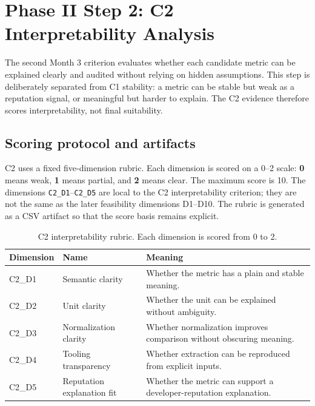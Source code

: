 \section{Phase II Step 2: C2 Interpretability Analysis}
\label{sec:phase2_c2_interpretability}

The second Month 3 criterion evaluates whether each candidate metric can be explained clearly and audited
without relying on hidden assumptions. This step is deliberately separated from C1 stability: a metric can be
stable but weak as a reputation signal, or meaningful but harder to explain. The C2 evidence therefore scores
interpretability, not final suitability.

\subsection{Scoring protocol and artifacts}
\label{sec:c2_protocol_artifacts}

C2 uses a fixed five-dimension rubric. Each dimension is scored on a 0--2 scale:
\textbf{0} means weak, \textbf{1} means partial, and \textbf{2} means clear. The maximum score is 10.
The dimensions \texttt{C2\_D1}--\texttt{C2\_D5} are local to the C2 interpretability criterion; they are not
the same as the later feasibility dimensions D1--D10. The rubric is generated as a CSV artifact so that the
score basis remains explicit.

\begin{table}[H]
\centering
\scriptsize
\renewcommand{\arraystretch}{1.08}
\begin{tabularx}{\textwidth}{p{2.1cm}p{3.6cm}X}
\toprule
\textbf{Dimension} & \textbf{Name} & \textbf{Meaning} \\
\midrule
C2\_D1 & Semantic clarity & Whether the metric has a plain and stable meaning. \\
C2\_D2 & Unit clarity & Whether the unit can be explained without ambiguity. \\
C2\_D3 & Normalization clarity & Whether normalization improves comparison without obscuring meaning. \\
C2\_D4 & Tooling transparency & Whether extraction can be reproduced from explicit inputs. \\
C2\_D5 & Reputation explanation fit & Whether the metric can support a developer-reputation explanation. \\
\bottomrule
\end{tabularx}
\caption{C2 interpretability rubric. Each dimension is scored from 0 to 2.}
\label{tab:c2_rubric}
\end{table}

